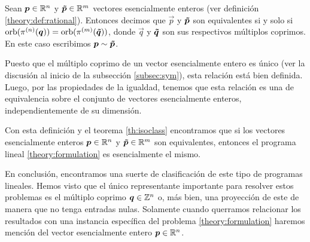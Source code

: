 \begin{definition}
	Sean $\boldsymbol{p} \in \mathbb{R}^n$ y $\boldsymbol{\tilde{p}} \in \mathbb{R}^m$ vectores esencialmente enteros (ver definición
	\ref{theory:def:rational}). Entonces decimos que $\vec{p}$ y $\boldsymbol{\tilde{p}}$ son equivalentes si y
	solo si $\operatorname{orb}(\pi^{(n)}(\boldsymbol{q})) = \operatorname{orb}(\pi^{(m)}(\boldsymbol{\tilde{q}}))$, donde $\vec{q}$ y $\boldsymbol{\tilde{q}}$ son
	sus respectivos múltiplos coprimos. En este caso escribimos $\boldsymbol{p} \sim \boldsymbol{\tilde{p}}$.
\end{definition}
Puesto que el múltiplo coprimo de un vector esencialmente entero es único (ver la discusión al
inicio de la subsección \ref{subsec:sym}), esta relación está bien definida. Luego, por las
propiedades de la igualdad, tenemos que esta relación es una de equivalencia sobre el conjunto de
vectores esencialmente enteros, independientemente de su dimensión.

Con esta definición y el teorema \ref{th:isoclass} encontramos que si los vectores esencialmente
enteros $\boldsymbol{p} \in \mathbb{R}^n$ y $\boldsymbol{\tilde{p}} \in \mathbb{R}^{m}$ son equivalentes, entonces el programa lineal
\eqref{theory:formulation} es esencialmente el mismo.

En conclusión, encontramos una suerte de clasificación de este tipo de programas lineales. Hemos
visto que el único representante importante para resolver estos problemas es el múltiplo coprimo
$\boldsymbol{q} \in \mathbb{Z}^n$ o, más bien, una proyección de este de manera que no tenga entradas nulas.
Solamente cuando querramos relacionar los resultados con una instancia específica del problema
\eqref{theory:formulation} haremos mención del vector esencialmente entero $\boldsymbol{p} \in \mathbb{R}^n$.

